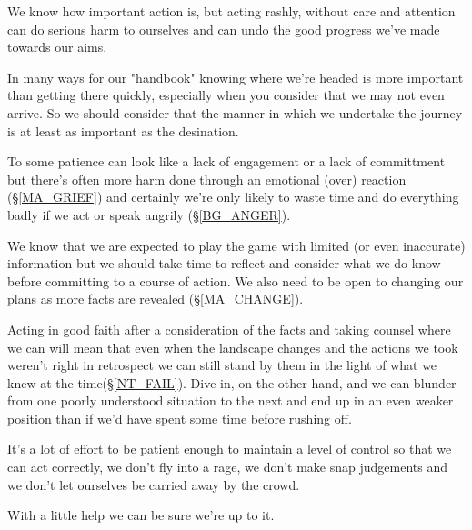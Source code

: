 \cleardoublepage
\begin{multicols}{2}

We know how important action is, but acting rashly, without care and attention can do serious harm to ourselves and can undo the good progress we've made towards our aims.

In many ways for our "handbook" knowing where we're headed is more important than getting there quickly, especially when you consider that we may not even arrive. So we should consider that the manner in which we undertake the journey is at least as important as the desination.

To some patience can look like a lack of engagement or a lack of committment but there's often more harm done through an emotional (over) reaction (\S \ref{MA_GRIEF}) and certainly we're only likely to waste time and do everything badly if we act or speak angrily (\S \ref{BG_ANGER}).

We know that we are expected to play the game with limited (or even inaccurate) information but we should take time to reflect and consider what we do know before committing to a course of action. We also need to be open to changing our plans as more facts are revealed (\S \ref{MA_CHANGE}).  

Acting in good faith after a consideration of the facts and taking counsel where we can will mean that even when the landscape changes and the actions we took weren't right in retrospect we can still stand by them in the light of what we knew at the time(\S \ref{NT_FAIL}). Dive in, on the other hand, and we can blunder from one poorly understood situation to the next and end up in an even weaker position than if we'd have spent some time before rushing off. 

It's a lot of effort to be patient enough to maintain a level of control so that we can act correctly, we don't fly into a rage, we don't make snap judgements and we don't let ourselves be carried away by the crowd.

With a little help we can be sure we're up to it.

\end{multicols}
\clearpage
